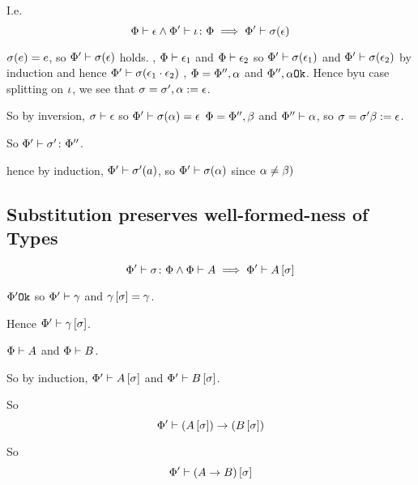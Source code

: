 {    I.e. \begin{equation}
        \Phi\vdash \epsilon\wedge\Phi' \vdash \iota \colon \Phi \implies \Phi'\vdash \sigma(\epsilon)
    \end{equation}

    \proof
    $\sigma(e) = e$, so $\Phi'\vdash \sigma(\epsilon)$ holds.
    \bi, $\Phi\vdash \epsilon_1$ and $\Phi\vdash \epsilon_2$ so $\Phi'\vdash \sigma(\epsilon_1)$ and $\Phi'\vdash \sigma(\epsilon_2)$ by induction and hence $\Phi'\vdash \sigma(\epsilon_1\cdot\epsilon_2)$
    \bi, $\Phi=\Phi'',\alpha$ and $\Phi'',\alpha \texttt{Ok}$. Hence byu case splitting on $\iota$, we see that $\sigma=\sigma', \alpha:=\epsilon$.

    So by inversion, $\sigma\vdash \epsilon$ so $\Phi'\vdash \sigma(\alpha)=\epsilon$
    \bi $\Phi=\Phi'', \beta$ and $\Phi''\vdash \alpha$, so $\sigma=\sigma'\beta:=\epsilon$.

    So $\Phi' \vdash \sigma' \colon \Phi''$.

    hence by induction, $\Phi'\vdash \sigma'(a)$, so $\Phi'\vdash \sigma(\alpha)$ since $\alpha\neq\beta)$

    \subsection{Substitution preserves well-formed-ness of Types}
    \begin{equation}
        \Phi' \vdash \sigma \colon \Phi \wedge \Phi\vdash A \implies \Phi'\vdash A\left[\sigma\right]
    \end{equation}
    \proof

    $\Phi' \texttt{Ok}$ so $\Phi'\vdash \gamma$ and $\gamma\left[\sigma\right]=\gamma$.

    Hence $\Phi'\vdash \gamma\left[\sigma\right]$.


    \bi $\Phi\vdash A$ and $\Phi\vdash B$.

    So by induction, $\Phi'\vdash A\left[\sigma\right]$ and $\Phi'\vdash B\left[\sigma\right]$.

    So \begin{equation}
        \Phi'\vdash (A\left[\sigma\right])\rightarrow (B\left[\sigma\right])
    \end{equation}

    So \begin{equation}
        \Phi'\vdash (A\rightarrow B)\left[\sigma\right]
    \end{equation}

    


}
